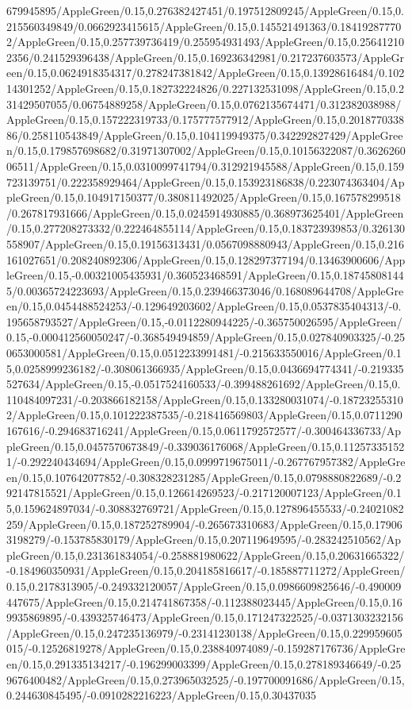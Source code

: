 {\begin{tikzternal}
{679945895/AppleGreen/0.15,0.276382427451/0.197512809245/AppleGreen/0.15,0.215560349849/0.0662923415615/AppleGreen/0.15,0.145521491363/0.184192877702/AppleGreen/0.15,0.257739736419/0.255954931493/AppleGreen/0.15,0.256412102356/0.241529396438/AppleGreen/0.15,0.169236342981/0.217237603573/AppleGreen/0.15,0.0624918354317/0.278247381842/AppleGreen/0.15,0.13928616484/0.10214301252/AppleGreen/0.15,0.182732224826/0.227132531098/AppleGreen/0.15,0.231429507055/0.06754889258/AppleGreen/0.15,0.0762135674471/0.312382038988/AppleGreen/0.15,0.157222319733/0.175777577912/AppleGreen/0.15,0.201877033886/0.258110543849/AppleGreen/0.15,0.104119949375/0.342292827429/AppleGreen/0.15,0.179857698682/0.31971307002/AppleGreen/0.15,0.10156322087/0.362626006511/AppleGreen/0.15,0.0310099741794/0.312921945588/AppleGreen/0.15,0.159723139751/0.222358929464/AppleGreen/0.15,0.153923186838/0.223074363404/AppleGreen/0.15,0.104917150377/0.380811492025/AppleGreen/0.15,0.167578299518/0.267817931666/AppleGreen/0.15,0.0245914930885/0.368973625401/AppleGreen/0.15,0.277208273332/0.222464855114/AppleGreen/0.15,0.183723939853/0.326130558907/AppleGreen/0.15,0.19156313431/0.0567098880943/AppleGreen/0.15,0.216161027651/0.208240892306/AppleGreen/0.15,0.128297377194/0.13463900606/AppleGreen/0.15,-0.00321005435931/0.360523468591/AppleGreen/0.15,0.187458081445/0.00365724223693/AppleGreen/0.15,0.239466373046/0.168089644708/AppleGreen/0.15,0.0454488524253/-0.129649203602/AppleGreen/0.15,0.0537835404313/-0.195658793527/AppleGreen/0.15,-0.0112280944225/-0.365750026595/AppleGreen/0.15,-0.000412560050247/-0.368549494859/AppleGreen/0.15,0.027840903325/-0.250653000581/AppleGreen/0.15,0.0512233991481/-0.215633550016/AppleGreen/0.15,0.0258999236182/-0.308061366935/AppleGreen/0.15,0.0436694774341/-0.219335527634/AppleGreen/0.15,-0.0517524160533/-0.399488261692/AppleGreen/0.15,0.110484097231/-0.203866182158/AppleGreen/0.15,0.133280031074/-0.187232553102/AppleGreen/0.15,0.101222387535/-0.218416569803/AppleGreen/0.15,0.0711290167616/-0.294683716241/AppleGreen/0.15,0.0611792572577/-0.300464336733/AppleGreen/0.15,0.0457570673849/-0.339036176068/AppleGreen/0.15,0.112573351521/-0.292240434694/AppleGreen/0.15,0.0999719675011/-0.267767957382/AppleGreen/0.15,0.107642077852/-0.308328231285/AppleGreen/0.15,0.0798880822689/-0.292147815521/AppleGreen/0.15,0.126614269523/-0.217120007123/AppleGreen/0.15,0.159624897034/-0.308832769721/AppleGreen/0.15,0.127896455533/-0.24021082259/AppleGreen/0.15,0.187252789904/-0.265673310683/AppleGreen/0.15,0.179063198279/-0.153785830179/AppleGreen/0.15,0.207119649595/-0.283242510562/AppleGreen/0.15,0.231361834054/-0.258881980622/AppleGreen/0.15,0.20631665322/-0.184960350931/AppleGreen/0.15,0.204185816617/-0.185887711272/AppleGreen/0.15,0.2178313905/-0.249332120057/AppleGreen/0.15,0.0986609825646/-0.490009447675/AppleGreen/0.15,0.214741867358/-0.112388023445/AppleGreen/0.15,0.169935869895/-0.439325746473/AppleGreen/0.15,0.171247322525/-0.0371303232156/AppleGreen/0.15,0.247235136979/-0.23141230138/AppleGreen/0.15,0.229959605015/-0.12526819278/AppleGreen/0.15,0.238840974089/-0.159287176736/AppleGreen/0.15,0.291335134217/-0.196299003399/AppleGreen/0.15,0.278189346649/-0.259676400482/AppleGreen/0.15,0.273965032525/-0.197700091686/AppleGreen/0.15,0.244630845495/-0.0910282216223/AppleGreen/0.15,0.30437035}
\end{tikzternal}}
